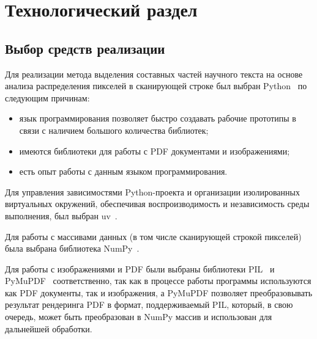 \section{Технологический раздел}



\subsection{Выбор средств реализации}

Для реализации метода выделения составных частей научного текста на основе анализа распределения пикселей в сканирующей строке был выбран Python~\cite{python} по следующим причинам:
\begin{itemize}
    \item язык программирования позволяет быстро создавать рабочие прототипы в связи с наличием большого количества библиотек;
    \item имеются библиотеки для работы с PDF документами и изображениями;
    \item есть опыт работы с данным языком программирования.
\end{itemize}

Для управления зависимостями Python-проекта и организации изолированных виртуальных окружений, обеспечивая воспроизводимость и независимость среды выполнения, был выбран uv~\cite{uv}.

Для работы с массивами данных (в том числе сканирующей строкой пикселей) была выбрана библиотека NumPy~\cite{numpy}.

Для работы с изображениями и PDF были выбраны библиотеки PIL~\cite{pil} и PyMuPDF~\cite{pymupdf} соответственно, так как в процессе работы программы используются как PDF документы, так и изображения, а PyMuPDF позволяет преобразовывать результат рендеринга PDF в формат, поддерживаемый PIL, который, в свою очередь, может быть преобразован в NumPy массив и использован для дальнейшей обработки.

